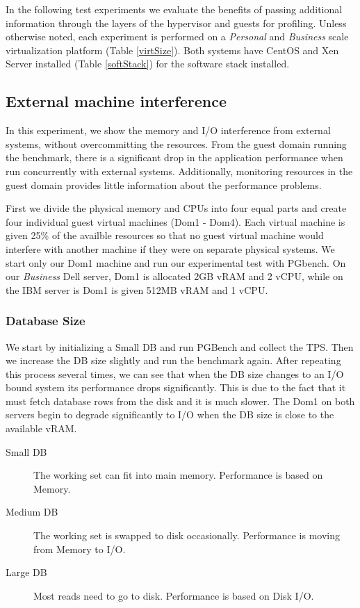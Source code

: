 In the following test experiments we evaluate the benefits of passing additional information through the layers of the hypervisor and guests for profiling.  Unless otherwise noted, each experiment is performed on a \emph{Personal} and \emph{Business} scale virtualization platform (Table \ref{virtSize}).  Both systems have CentOS and Xen Server installed (Table \ref{softStack}) for the software stack installed.

\subsection{External machine interference}
In this experiment, we show the memory and I/O interference from external systems, without overcommitting the resources.  From the guest domain running the benchmark, there is a significant drop in the application performance when run concurrently with external systems.  Additionally, monitoring resources in the guest domain provides little information about the performance problems. 

First we divide the physical memory and CPUs into four equal parts and create four individual guest virtual machines (Dom1 - Dom4).  Each virtual machine is given 25\% of the availble resources so that no guest virtual machine would interfere with another machine if they were on separate physical systems.  We start only our Dom1 machine and run our experimental test with PGbench.  On our \emph{Business} Dell server, Dom1 is allocated 2GB vRAM and 2 vCPU, while on the IBM server is Dom1 is given 512MB vRAM and 1 vCPU.  

\subsubsection{Database Size}
We start by initializing a Small DB and run PGBench and collect the TPS.  Then we increase the DB size slightly and run the benchmark again.  After repeating this process several times, we can see that when the DB size changes to an I/O bound system its performance drops significantly.  This is due to the fact that it must fetch database rows from the disk and it is much slower.  The Dom1 on both servers begin to degrade significantly to I/O when the DB size is close to the available vRAM.

\begin{description}
  \item[Small DB] The working set can fit into main memory.  Performance is based on Memory.
  \item[Medium DB] The working set is swapped to disk occasionally. Performance is moving from Memory to I/O.
  \item[Large DB] Most reads need to go to disk.  Performance is based on Disk I/O.
\end{description}

